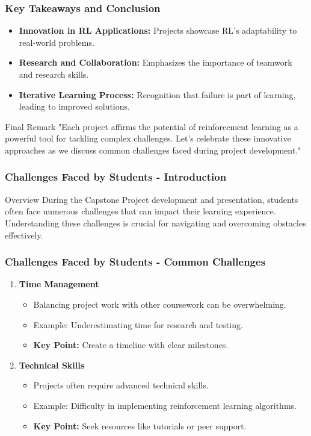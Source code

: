 \documentclass{beamer}
\begin{document}
\begin{frame}[fragile]
    \frametitle{Key Takeaways and Conclusion}
    \begin{itemize}
        \item \textbf{Innovation in RL Applications:} Projects showcase RL's adaptability to real-world problems.
        \item \textbf{Research and Collaboration:} Emphasizes the importance of teamwork and research skills.
        \item \textbf{Iterative Learning Process:} Recognition that failure is part of learning, leading to improved solutions.
    \end{itemize}

    \begin{block}{Final Remark}
        "Each project affirms the potential of reinforcement learning as a powerful tool for tackling complex challenges. Let's celebrate these innovative approaches as we discuss common challenges faced during project development."
    \end{block}
\end{frame}

\begin{frame}[fragile]
    \frametitle{Challenges Faced by Students - Introduction}
    \begin{block}{Overview}
        During the Capstone Project development and presentation, students often face numerous challenges that can impact their learning experience. Understanding these challenges is crucial for navigating and overcoming obstacles effectively.
    \end{block}
\end{frame}

\begin{frame}[fragile]
    \frametitle{Challenges Faced by Students - Common Challenges}
    \begin{enumerate}
        \item \textbf{Time Management}
            \begin{itemize}
                \item Balancing project work with other coursework can be overwhelming.
                \item Example: Underestimating time for research and testing.
                \item \textbf{Key Point:} Create a timeline with clear milestones.
            \end{itemize}
        
        \item \textbf{Technical Skills}
            \begin{itemize}
                \item Projects often require advanced technical skills.
                \item Example: Difficulty in implementing reinforcement learning algorithms.
                \item \textbf{Key Point:} Seek resources like tutorials or peer support.
            \end{itemize}
    \end{enumerate}
\end{frame}
\end{document}
